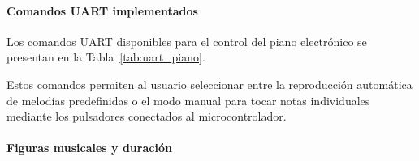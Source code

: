 \begin{table}[H]
\centering
{}
\caption{Asignación de pines utilizada en el piano electrónico.}
\label{tab:pines_piano}
\end{table}

\paragraph{Comandos UART implementados}

Los comandos UART disponibles para el control del piano electrónico se presentan en la Tabla~\ref{tab:uart_piano}. 

\begin{table}[H]
\centering
{}
\caption{Comandos UART disponibles para el control del piano electrónico.}
\label{tab:uart_piano}
\end{table}

Estos comandos permiten al usuario seleccionar entre la reproducción automática de melodías predefinidas o el modo manual para tocar notas individuales mediante los pulsadores conectados al microcontrolador.

\vspace{0.5cm}

\paragraph{Figuras musicales y duración}


